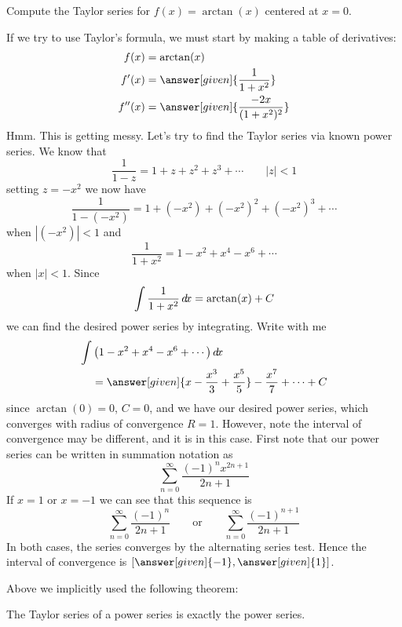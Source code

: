 \documentclass{ximera}
\begin{document}
\begin{example}
  Compute the Taylor series for $f(x) = \arctan(x)$ centered at $x=0$.
  \begin{explanation}
    If we try to use Taylor's formula, we must start by making a table
    of derivatives:
    \begin{align*}
      f(x) &= \arctan(x)\\
      f'(x) &= \answer[given]{\frac{1}{1+x^2}}\\
      f''(x) &= \answer[given]{\frac{-2x}{(1+x^2)^2}}
    \end{align*}
    Hmm. This is getting messy. Let's try to find the Taylor series
    via known power series. We know that
    \[
    \frac{1}{1-z} = 1+ z+ z^2 + z^3 + \cdots \qquad |z|< 1
    \]
    setting $z = -x^2$ we now have
    \[
    \frac{1}{1-(-x^2)} = 1 + (-x^2)+ (-x^2)^2 + (-x^2)^3 + \cdots
    \]
    when $|(-x^2)|< 1$ and
    \[
    \frac{1}{1+x^2} = 1 - x^2 + x^4 - x^6 + \cdots 
    \]
    when $|x|< 1$. Since
    \[
    \int\frac{1}{1+x^2} \mathop{}\!d\! x = \arctan(x) + C
    \]
    we can find the desired power series by integrating. Write with me
    \begin{align*}
      \int &\left(1 - x^2 + x^4 - x^6 + \cdots\right)\d x \\
      &= \answer[given]{x - \frac{x^3}{3} + \frac{x^5}{5}} - \frac{x^7}{7} + \cdots +C
    \end{align*}
    since $\arctan(0) = 0$, $C=0$, and we have our desired power
    series, which converges with radius of convergence $R=1$. However,
    note the interval of convergence may be different, and it is in
    this case. First note that our power series can be written in summation notation as
    \[
    \sum_{n=0}^\infty \frac{(-1)^n x^{2n+1}}{2n+1}
    \]
    If $x=1$ or $x=-1$ we can see that this sequence is
    \[
    \sum_{n=0}^\infty \frac{(-1)^n}{2n+1}\qquad\text{or}\qquad\sum_{n=0}^\infty \frac{(-1)^{n+1}}{2n+1}
    \]
    In both cases, the series converges by the alternating series
    test. Hence the interval of convergence is $[\answer[given]{-1},\answer[given]{1}]$.
  \end{explanation}
\end{example}

Above we implicitly used the following theorem:


\begin{theorem}
  The Taylor series of a power series is exactly the power series.
\end{theorem}
\end{document}
